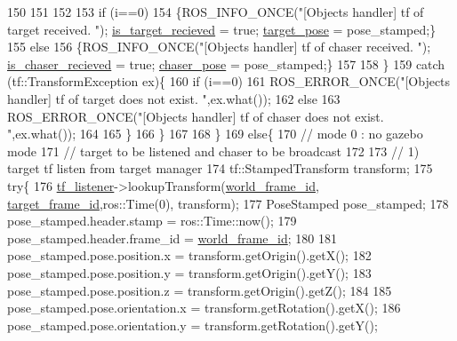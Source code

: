 \begin{DoxyCode}
150 
151 
152 
153                 \textcolor{keywordflow}{if} (i==0)
154                     \{ROS\_INFO\_ONCE(\textcolor{stringliteral}{"[Objects handler] tf of target received. "}); 
      \hyperlink{class_objects_handler_a7691f3e1ec58e55ead30c50c555f169a}{is\_target\_recieved} = \textcolor{keyword}{true}; \hyperlink{class_objects_handler_ad436bfd8b262f473f0e4ca92b3c3402b}{target\_pose} = pose\_stamped;\} 
155                 \textcolor{keywordflow}{else}
156                     \{ROS\_INFO\_ONCE(\textcolor{stringliteral}{"[Objects handler] tf of chaser received. "}); 
      \hyperlink{class_objects_handler_a86f8528ff5697c87fc6a3fcd6ba0f42c}{is\_chaser\_recieved} = \textcolor{keyword}{true}; \hyperlink{class_objects_handler_a79fd5f872a40cca5ea599f1e83dcb3ad}{chaser\_pose} = pose\_stamped;\}  
157 
158             \}
159             \textcolor{keywordflow}{catch} (tf::TransformException ex)\{
160                 \textcolor{keywordflow}{if} (i==0)
161                     ROS\_ERROR\_ONCE(\textcolor{stringliteral}{"[Objects handler] tf of target does not exist. "},ex.what());  
162                 \textcolor{keywordflow}{else}
163                     ROS\_ERROR\_ONCE(\textcolor{stringliteral}{"[Objects handler] tf of chaser does not exist. "},ex.what());  
164             
165             \}
166         \}
167 
168     \}
169     \textcolor{keywordflow}{else}\{
170         \textcolor{comment}{// mode 0 : no gazebo mode  }
171         \textcolor{comment}{// target to be listened and chaser to be broadcast  }
172 
173         \textcolor{comment}{// 1) target tf listen from target manager  }
174         tf::StampedTransform transform;    
175         \textcolor{keywordflow}{try}\{
176             \hyperlink{class_objects_handler_aea45bba31aa769008386100725bda66b}{tf\_listener}->lookupTransform(\hyperlink{class_objects_handler_a1c0586ae7467bb8a3df8ad247ac7b10b}{world\_frame\_id},
      \hyperlink{class_objects_handler_a7a616768386c4c7da9af4da3d07bd936}{target\_frame\_id},ros::Time(0), transform);
177             PoseStamped pose\_stamped;
178             pose\_stamped.header.stamp = ros::Time::now();
179             pose\_stamped.header.frame\_id = \hyperlink{class_objects_handler_a1c0586ae7467bb8a3df8ad247ac7b10b}{world\_frame\_id};
180 
181             pose\_stamped.pose.position.x = transform.getOrigin().getX();
182             pose\_stamped.pose.position.y = transform.getOrigin().getY();
183             pose\_stamped.pose.position.z = transform.getOrigin().getZ();
184 
185             pose\_stamped.pose.orientation.x = transform.getRotation().getX();
186             pose\_stamped.pose.orientation.y = transform.getRotation().getY();

\end{DoxyCode}
